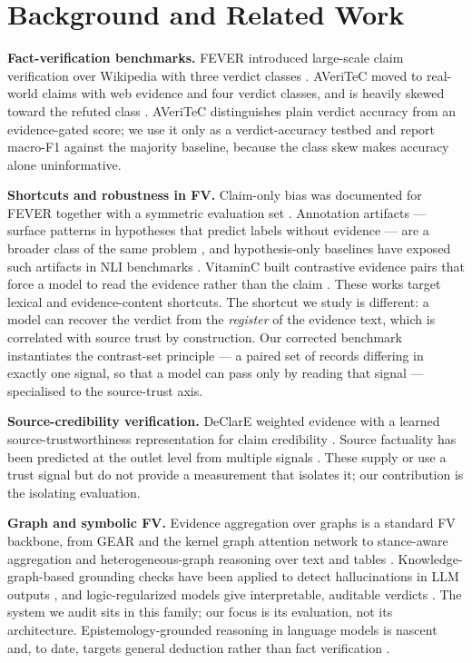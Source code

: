 \documentclass[11pt]{article}
\begin{document}
\section{Background and Related Work}
\textbf{Fact-verification benchmarks.} FEVER introduced large-scale claim verification over Wikipedia with three verdict classes \citep{thorne2018fever}. AVeriTeC moved to real-world claims with web evidence and four verdict classes, and is heavily skewed toward the refuted class \citep{schlichtkrull2023averitec}. AVeriTeC distinguishes plain verdict accuracy from an evidence-gated score; we use it only as a verdict-accuracy testbed and report macro-F1 against the majority baseline, because the class skew makes accuracy alone uninformative.

\textbf{Shortcuts and robustness in FV.} Claim-only bias was documented for FEVER together with a symmetric evaluation set \citep{schuster2019debias}. Annotation artifacts --- surface patterns in hypotheses that predict labels without evidence --- are a broader class of the same problem \citep{gururangan2018annotation}, and hypothesis-only baselines have exposed such artifacts in NLI benchmarks \citep{poliak2018hypothesis}. VitaminC built contrastive evidence pairs that force a model to read the evidence rather than the claim \citep{schuster2021vitaminc}. These works target lexical and evidence-content shortcuts. The shortcut we study is different: a model can recover the verdict from the \emph{register} of the evidence text, which is correlated with source trust by construction. Our corrected benchmark instantiates the contrast-set principle \citep{gardner2020evaluating} --- a paired set of records differing in exactly one signal, so that a model can pass only by reading that signal --- specialised to the source-trust axis.

\textbf{Source-credibility verification.} DeClarE weighted evidence with a learned source-trustworthiness representation for claim credibility \citep{popat2018declare}. Source factuality has been predicted at the outlet level from multiple signals \citep{baly2018factuality}. These supply or use a trust signal but do not provide a measurement that isolates it; our contribution is the isolating evaluation.

\textbf{Graph and symbolic FV.} Evidence aggregation over graphs is a standard FV backbone, from GEAR \citep{zhou2019gear} and the kernel graph attention network \citep{liu2020kgat} to stance-aware aggregation \citep{si2021tarsa} and heterogeneous-graph reasoning over text and tables \citep{gong2024heterfc}. Knowledge-graph-based grounding checks have been applied to detect hallucinations in LLM outputs \citep{sansford2024grapheval}, and logic-regularized models give interpretable, auditable verdicts \citep{chen2022loren}. The system we audit sits in this family; our focus is its evaluation, not its architecture. Epistemology-grounded reasoning in language models is nascent and, to date, targets general deduction rather than fact verification \citep{sathish2026pramana}.
\end{document}
